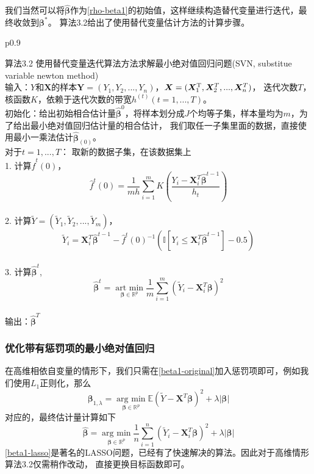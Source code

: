 我们当然可以将$\hat{\bm{\beta}}$作为\eqref{rho-beta1}的初始值，这样继续构造替代变量进行迭代，最终收敛到$\bm{\beta}^*$。
算法3.2给出了使用替代变量估计方法的计算步骤。
\begin{table}[H]%
    \centering%
    \begin{tabular}{{p{0.9\columnwidth}}}%
    
    \toprule%
    算法3.2 使用替代变量迭代算法方法求解最小绝对值回归问题(SVN, substitue variable newton method)\\
    \midrule%
    输入：$Y$和$\bm{X}$的样本$\bm{Y} = (Y_1, Y_2, ..., Y_n)$，$\bm{X} = (\bm{X}^{\rm T}_1, \bm{X}^T_2, ..., \bm{X}^T_n)$，
    迭代次数$T$，核函数$K$，依赖于迭代次数的带宽$h^{(t)}(t = 1, ..., T)。$
    \\
    初始化：给出初始相合估计量$\hat{\bm{\beta}}^{0} $，将样本划分成$J$个均等子集，样本量均为$m$，为了给出最小绝对值回归估计量的相合估计，
    我们取任一子集里面的数据，直接使用最小一乘法估计$\hat{\bm{\beta}}_{(0)}$。
    \\
    对于$t = 1, ..., T$：
    取新的数据子集，在该数据集上
    \\
        1. 计算$\hat{f}^{t}(0)$，
        $$
        \hat{f}^{t}(0) = \frac1{mh}\sum_{i=1}^{m}K(\frac{Y_i - \bm{X}_i^T\hat{\bm{\beta}}^{t-1}}{h_t})
        $$
    \\
        2. 计算$\tilde{Y} = (\tilde Y_1, \tilde Y_2, ..., \tilde Y_m)$，
        $$
        \tilde{Y}_i = \bm{X}^T_i\hat{\bm{\beta}}^{t-1} - \hat{f}^{t}(0)^{-1}
        (\mathbb{I}[Y_i \leq \bm{X}_i^T \hat{\bm{\beta}}^{t-1}] - 0.5)
        $$
    \\
        3. 计算$\hat{\bm{\beta}}^{t}$,
        $$
        \hat{\bm{\beta}}^{t} = \underset{\bm{\beta} \in \mathbb{R}^{p}}{\operatorname{art\ min}}
        \frac1{m}\sum_{i=1}^m (\tilde{Y}_i - \bm{X}_i^T\bm{\beta})^2
        $$
    \\
    输出：$\hat{\bm{\beta}}^{T}$
    \\
    \bottomrule%
    \end{tabular}
\end{table}%

\subsubsection{优化带有惩罚项的最小绝对值回归}
在高维相依自变量的情形下，我们只需在\eqref{beta1-original}加入惩罚项即可，例如我们使用$L_1$正则化，那么
\begin{equation}
    \bm{\beta}_{1, \lambda} =\underset{\bm{\beta} \in \mathbb{R}^{p}}{\operatorname{arg\ min}} 
    \mathbb{E}(\tilde Y - \bm{X}^T \bm{\beta})^2 + \lambda|\bm{\beta}|
\end{equation}
对应的，最终估计量计算如下
\begin{equation}\label{beta1-lasso}
    \hat{\bm{\beta}} = \underset{\bm{\beta} \in \mathbb{R}^{p}}{\operatorname{arg\ min}}
    \frac1{n} \sum_{i=1}^n(\tilde{Y}_i - \bm{X}_i^T\bm{\beta})^2 + \lambda|\bm{\beta}|
\end{equation}
\eqref{beta1-lasso}是著名的LASSO问题，已经有了快速解决的算法。因此对于高维情形算法3.2仅需稍作改动，
直接更换目标函数即可。

